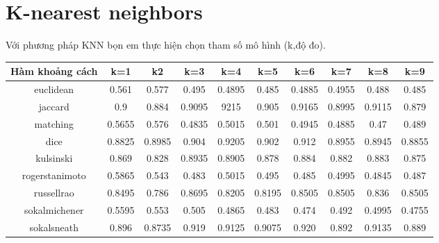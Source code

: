 \documentclass[a4paper,12pt]{report}
\begin{document}
\section{K-nearest neighbors}
Với phương pháp KNN bọn em thực hiện chọn tham số mô hình (k,độ đo). 
\begin{longtable}{|c|c|c|c|c|c|c|c|c|c|}
\hline
Hàm khoảng cách & k=1 &k2& k=3&k=4 & k=5 &k=6 & k=7&k=8 & k=9\\
\hline
euclidean & 0.561&0.577 &0.495 &0.4895&0.485&0.4885&0.4955&0.488&0.485 \\
\hline 
jaccard & 0.9 &0.884& 0.9095 &9215& 0.905 & 0.9165& 0.8995 &0.9115& 0.879 \\ \hline
matching & 0.5655 &0.576& 0.4835 & 0.5015&  0.501 & 0.4945&0.4885 &0.47& 0.489 \\ \hline 
dice &0.8825 &0.8985& 0.904 &0.9205&  0.902 & 0.912& 0.8955 &0.8945& 0.8855 \\ \hline
kulsinski&  0.869 & 0.828& 0.8935&0.8905&  0.878& 0.884& 0.882 & 0.883& 0.875 \\ \hline 
rogerstanimoto&  0.5865& 0.543& 0.483&0.5015& 0.495 & 0.485&0.4995& 0.4845& 0.487 \\ \hline
russellrao&  0.8495&0.786& 0.8695& 0.8205&0.8195 &0.8505  &0.8505& 0.836& 0.8505 \\ \hline 
sokalmichener& 0.5595&0.553& 0.505 & 0.4865 &0.483 &0.474 &0.492& 0.4995 &0.4755 \\ \hline 
sokalsneath& 0.896& 0.8735& 0.919 &0.9125 & 0.9075&0.920& 0.892 & 0.9135& 0.889 \\ \hline
\end{longtable}
\end{document}
